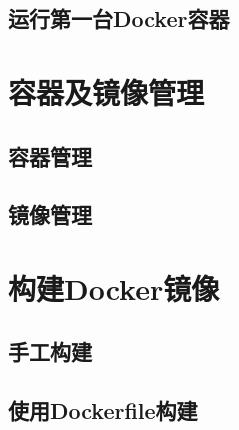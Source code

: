 \subsection{运行第一台Docker容器}
\label{sec:runFirstDocker}

\section{容器及镜像管理}
\label{sec:containerManagement}

\subsection{容器管理}
\label{sec:containerManage}

\subsection{镜像管理}
\label{sec:dockerImageManage}

\section{构建Docker镜像}
\label{sec:buildDockerImage}

\subsection{手工构建}
\label{sec:buildDockerImgByHand}

\subsection{使用Dockerfile构建}
\label{sec:buildDockerImgByFile}


